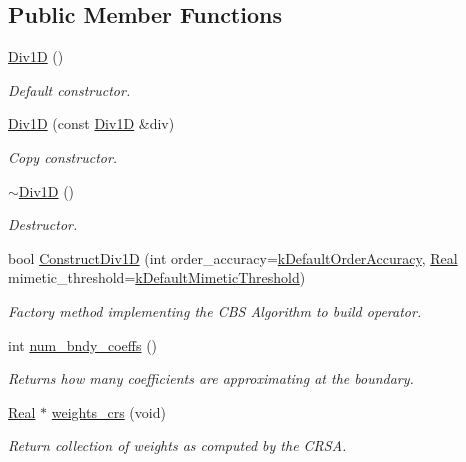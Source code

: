 \subsection*{Public Member Functions}
\begin{DoxyCompactItemize}
\item 
\hyperlink{classmtk_1_1Div1D_a339c66dd4ed8f50cbeda3645de18e5ab}{Div1\-D} ()
\begin{DoxyCompactList}\small\item\em Default constructor. \end{DoxyCompactList}\item 
\hyperlink{classmtk_1_1Div1D_a25376152cf97aa27f6b61bcb62b4ea7a}{Div1\-D} (const \hyperlink{classmtk_1_1Div1D}{Div1\-D} \&div)
\begin{DoxyCompactList}\small\item\em Copy constructor. \end{DoxyCompactList}\item 
\hyperlink{classmtk_1_1Div1D_ac2c215f42b8da513df2a4ee477b5fa1f}{$\sim$\-Div1\-D} ()
\begin{DoxyCompactList}\small\item\em Destructor. \end{DoxyCompactList}\item 
bool \hyperlink{classmtk_1_1Div1D_a52fcd1542f11e606e36bd188e48bfdf7}{Construct\-Div1\-D} (int order\-\_\-accuracy=\hyperlink{group__c01-roots_ga0d95560098eb36420511103637b6952f}{k\-Default\-Order\-Accuracy}, \hyperlink{group__c01-roots_gac080bbbf5cbb5502c9f00405f894857d}{Real} mimetic\-\_\-threshold=\hyperlink{group__c01-roots_ga35718d949bdc81a08a9cc8ebbe3478a2}{k\-Default\-Mimetic\-Threshold})
\begin{DoxyCompactList}\small\item\em Factory method implementing the C\-B\-S Algorithm to build operator. \end{DoxyCompactList}\item 
int \hyperlink{classmtk_1_1Div1D_a3739d9659cf6c31fd2f21bc9fcaaef98}{num\-\_\-bndy\-\_\-coeffs} ()
\begin{DoxyCompactList}\small\item\em Returns how many coefficients are approximating at the boundary. \end{DoxyCompactList}\item 
\hyperlink{group__c01-roots_gac080bbbf5cbb5502c9f00405f894857d}{Real} $\ast$ \hyperlink{classmtk_1_1Div1D_a77e27cac7b7a105311d882e5d126d1bf}{weights\-\_\-crs} (void)
\begin{DoxyCompactList}\small\item\em Return collection of weights as computed by the C\-R\-S\-A. \end{DoxyCompactList}\item 

\end{DoxyCompactItemize}
